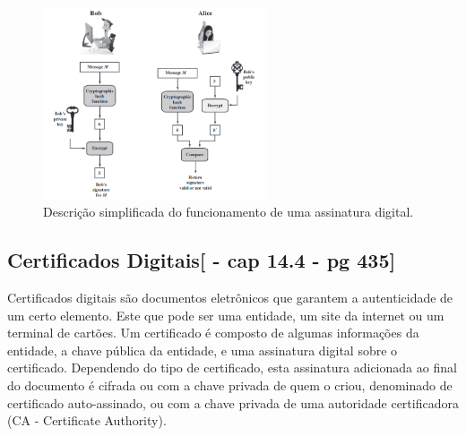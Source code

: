 \documentclass{article}
\begin{document}
		\begin{figure}[hb!]
			\centering
			\includegraphics[width=250px]{AssinaturaDigital.png}
			\caption{Descrição simplificada do funcionamento de uma assinatura digital.}
			\label{fig:digiSign}

		\end{figure}

		\subsection{Certificados Digitais[\cite{STALLINS} - cap 14.4 - pg 435]}
			\begin{justify}
			
				
					\hspace{2cm}Certificados digitais são documentos eletrônicos que garantem a autenticidade de um certo elemento. Este que pode ser uma entidade, um site da internet ou um terminal de cartões. Um certificado é composto de algumas informações da entidade,  a chave pública da entidade, e uma assinatura digital sobre o certificado. Dependendo do tipo de certificado, esta assinatura adicionada ao final do documento é cifrada ou com a chave privada de quem o criou, denominado de certificado auto-assinado, ou com a chave privada de uma autoridade certificadora (CA - Certificate Authority). \\

			
			\end{justify}

    
\end{document}
